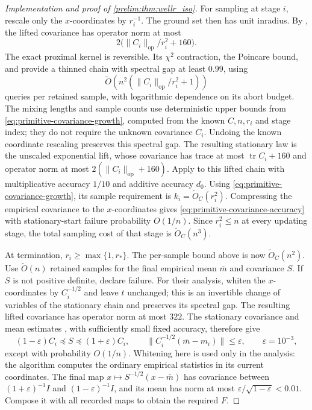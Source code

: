\documentclass[11pt]{article}
\numberwithin{equation}{section}
\theoremstyle{definition}
\newcommand{\op}{\mathrm{op}}
\begin{document}
\begin{proof}[Implementation and proof of \cref{prelim:thm:wellr_iso}]
For sampling at stage $i$, rescale only the $x$-coordinates by $r_i^{-1}$.
The ground set then has unit inradius.
By \cite[Lemma~2.5]{KV25}, the lifted covariance has operator norm at most
\[
 2\bigl(\|C_i\|_{\op}/r_i^2+160\bigr).
\]
The exact proximal kernel is reversible.
Its $\chi^2$ contraction, the Poincare bound, and
\cite[Lemma~2.14]{KV25} provide a thinned chain with spectral gap at least
$0.99$, using
\[
 \widetilde O\!\left(n^2\left(\|C_i\|_{\op}/r_i^2+1\right)\right)
\]
queries per retained sample, with logarithmic dependence on its abort budget.
The mixing lengths and sample counts use deterministic upper bounds from
\eqref{eq:primitive-covariance-growth}, computed from the known $C,n,r_i$
and stage index; they do not require the unknown covariance $C_i$.
Undoing the known coordinate rescaling preserves this spectral gap.
The resulting stationary law is the unscaled exponential lift, whose
covariance has trace at most $\operatorname{tr}C_i+160$ and operator norm
at most $2(\|C_i\|_{\op}+160)$.
Apply \cite[Theorem~8]{KZ24:arxiv} to this lifted chain with multiplicative
accuracy $1/10$ and additive accuracy $d_0$.
Using \eqref{eq:primitive-covariance-growth}, its sample requirement is
$k_i=\widetilde O_C(r_i^2)$.
Compressing the empirical covariance to the $x$-coordinates gives
\eqref{eq:primitive-covariance-accuracy} with stationary-start failure
probability $O(1/n)$.
Since $r_i^2\leq n$ at every updating stage, the total sampling cost of
that stage is $\widetilde O_C(n^3)$.

At termination, $r_i\geq\max\{1,r_*\}$.
The per-sample bound above is now $\widetilde O_C(n^2)$.
Use $\widetilde O(n)$ retained samples for the final empirical mean
$\bar m$ and covariance $S$.
If $S$ is not positive definite, declare failure.
For their analysis, whiten the $x$-coordinates by $C_i^{-1/2}$ and leave
$t$ unchanged; this is an invertible change of variables of the stationary
chain and preserves its spectral gap.
The resulting lifted covariance has operator norm at most $322$.
The stationary covariance and mean estimates
\cite[Corollaries~10 and~33]{KZ24:arxiv}, with sufficiently small fixed
accuracy, therefore give
\[
 (1-\varepsilon)C_i\preceq S\preceq(1+\varepsilon)C_i,
 \qquad
 \|C_i^{-1/2}(\bar m-m_i)\|\leq\varepsilon,
 \qquad \varepsilon=10^{-3},
\]
except with probability $O(1/n)$.
Whitening here is used only in the analysis: the algorithm computes the
ordinary empirical statistics in its current coordinates.
The final map $x\mapsto S^{-1/2}(x-\bar m)$ has covariance between
$(1+\varepsilon)^{-1}I$ and $(1-\varepsilon)^{-1}I$, and its mean has norm
at most $\varepsilon/\sqrt{1-\varepsilon}<0.01$.
Compose it with all recorded maps to obtain the required $F$.


\end{proof}
\end{document}
